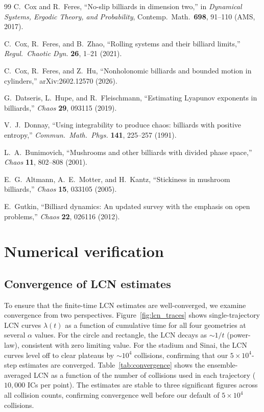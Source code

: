 \documentclass[aps,prd,twocolumn,superscriptaddress,nofootinbib,floatfix]{revtex4-2}
\begin{document}
\begin{thebibliography}{99}
C.~Cox and R.~Feres,
``No-slip billiards in dimension two,''
in \textit{Dynamical Systems, Ergodic Theory, and Probability},
Contemp.\ Math.\ \textbf{698}, 91--110 (AMS, 2017).

C.~Cox, R.~Feres, and B.~Zhao,
``Rolling systems and their billiard limits,''
\textit{Regul.\ Chaotic Dyn.} \textbf{26}, 1--21 (2021).

C.~Cox, R.~Feres, and Z.~Hu,
``Nonholonomic billiards and bounded motion in cylinders,''
arXiv:2602.12570 (2026).

G.~Datseris, L.~Hupe, and R.~Fleischmann,
``Estimating Lyapunov exponents in billiards,''
\textit{Chaos} \textbf{29}, 093115 (2019).

V.~J.~Donnay,
``Using integrability to produce chaos: billiards with positive entropy,''
\textit{Commun.\ Math.\ Phys.} \textbf{141}, 225--257 (1991).

L.~A.~Bunimovich,
``Mushrooms and other billiards with divided phase space,''
\textit{Chaos} \textbf{11}, 802--808 (2001).

E.~G.~Altmann, A.~E.~Motter, and H.~Kantz,
``Stickiness in mushroom billiards,''
\textit{Chaos} \textbf{15}, 033105 (2005).

E.~Gutkin,
``Billiard dynamics: An updated survey with the emphasis on open problems,''
\textit{Chaos} \textbf{22}, 026116 (2012).

\end{thebibliography}


\appendix
\section{Numerical verification}
\label{app:verification}

\subsection{Convergence of LCN estimates}
\noindent
To ensure that the finite-time LCN estimates are well-converged, we examine convergence from two perspectives. Figure~\ref{fig:lcn_traces} shows single-trajectory LCN curves $\lambda(t)$ as a function of cumulative time for all four geometries at several $\alpha$ values. For the circle and rectangle, the LCN decays as $\sim 1/t$ (power-law), consistent with zero limiting value. For the stadium and Sinai, the LCN curves level off to clear plateaus by $\sim 10^4$ collisions, confirming that our $5\times 10^4$-step estimates are converged. Table~\ref{tab:convergence} shows the ensemble-averaged LCN as a function of the number of collisions used in each trajectory ($10{,}000$ ICs per point). The estimates are stable to three significant figures across all collision counts, confirming convergence well before our default of $5\times10^4$ collisions.
\end{document}
